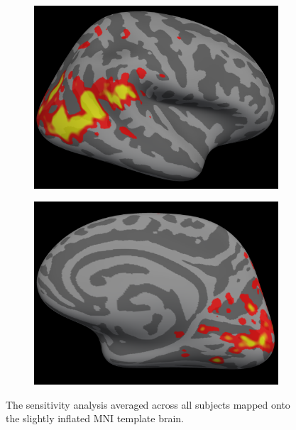 \documentclass[preprint,authoryear,12pt]{elsarticle}
\begin{document}
\begin{figure}
\begin{subfigure}{0.4\textwidth}
\caption{}
\label{fig:lh-medial-smax-average}
\end{subfigure}
\begin{subfigure}{0.4\textwidth}
\centering
\includegraphics[width=\textwidth]{figures/rh-lateral-smax-average}
\caption{}
\label{fig:rh-lateral-smax-average}
\end{subfigure}
\begin{subfigure}{0.4\textwidth}
\centering
\includegraphics[width=\textwidth]{figures/rh-medial-smax-average}
\caption{}
\label{fig:rh-medial-smax-average}
\end{subfigure}
\caption{The sensitivity analysis averaged across all subjects mapped onto the slightly inflated MNI template brain.}
\label{fig:MNI-average-sensitivity}
\end{figure}
\end{document}
